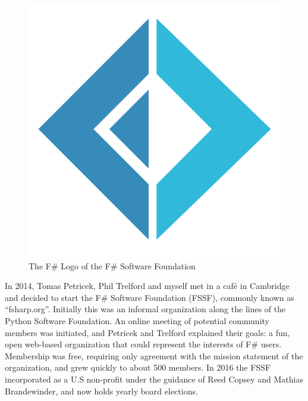 \documentclass[acmsmall,screen]{acmart}
\begin{document}
\begin{figure}
  \begin{center}
  \includegraphics[width=0.8\linewidth]{fsharp-logo.png}
  \end{center}
  \caption{The F\# Logo of the F\# Software Foundation}
  \label{fig:fsharp-logo}
\end{figure}

In 2014, Tomas Petricek, Phil Trelford and myself met in a café in Cambridge and decided to start the F\# Software
Foundation (FSSF), commonly known as “fsharp.org”.  Initially this was an informal organization along the lines of the Python
Software Foundation.  An online meeting of potential community members was initiated, and Petricek and Trelford explained
their goals: a fun, open web-based organization that could represent the interests of F\# users.  Membership was free,
requiring only agreement with the mission statement of the organization, and grew quickly to about 500 members.  In 2016 the
FSSF incorporated as a U.S non-profit under the guidance of Reed Copsey and Mathias Brandewinder, and now holds yearly board elections. 
\end{document}
